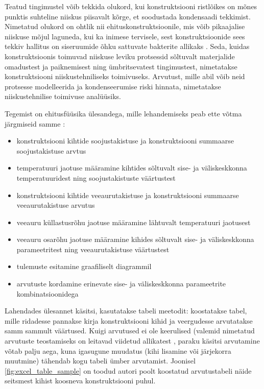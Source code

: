 Teatud tingimustel võib tekkida olukord, kui konstruktsiooni ristlõikes on mõnes punktis suhteline niiskus
piisavalt kõrge, et soodustada kondensaadi tekkimist. Nimetatud olukord on ohtlik
nii ehituskonstruktsioonile, mis võib pikaajalise niiskuse mõjul laguneda, kui ka inimese tervisele, sest konstruktsioonide
sees tekkiv hallitus on siseruumide õhku sattuvate bakterite allikaks \cite{rokka_hygrothermal}.    
Seda, kuidas konstruktsioonis toimuvad niiskuse leviku protsessid sõltuvalt materjalide omadustest ja 
paiknemisest ning ümbritsevatest tingimustest, nimetatakse konstruktsiooni niiskustehniliseks toimivuseks\cite{iso_13788}. Arvutust,
mille abil võib neid protsesse modelleerida ja kondenseerumise riski hinnata, nimetatakse niiskustehnilise toimivuse
analüüsiks.

Tegemist on ehitusfüüsika ülesandega, mille lehandemiseks peab ette võtma järgmiseid samme \cite{iso_13788}:
\begin{itemize}
    \item konstruktsiooni kihtide soojustakistuse ja konstruktsiooni summaarse soojustakistuse arvtus
    \item temperatuuri jaotuse määramine kihtides sõltuvalt sise- ja väliskeskkonna temperatuuridest ning 
    soojustakistuste väärtustest 
    \item konstruktsiooni kihtide veeaurutakistuse ja konstruktsiooni summaarse veeaurutakistuse arvutus
    \item veeauru küllastusrõhu jaotuse määramine lähtuvalt temperatuuri jaotusest
    \item veeauru osarõhu jaotuse määramine kihides sõltuvalt sise- ja väliskeskkonna parameetritest ning 
    veeaurutakistuse väärtustest 
    \item tulemuste esitamine graafiliselt diagrammil 
    \item arvutuste kordamine erinevate sise- ja väliskeskkonna parameetrite kombinatsioonidega
\end{itemize}

Lahendades ülesannet käsitsi, kasutatakse tabeli meetodit: koostatakse tabel, mille ridadesse pannakse 
kirja konstruktsiooni kihid ja veergudesse arvutatakse samm sammult väärtused. 
Kuigi arvutused ei ole keerulised (valemid nimetatud arvutuste teostamiseks on 
leitavad viidetud allikatest \cite{building_physics_abc}\cite{iso_13788}\cite{ehituskonstruktor}, paraku käsitsi arvutamine 
võtab palju aega, kuna igasugune muudatus (kihi lisamine või järjekorra muutmine) tähendab 
kogu tabeli ümber arvutamist. Joonisel \ref{fig:excel_table_sample} on toodud autori poolt koostatud arvutustabeli näide
seitsmest kihist koosneva konstruktsiooni puhul.
 
